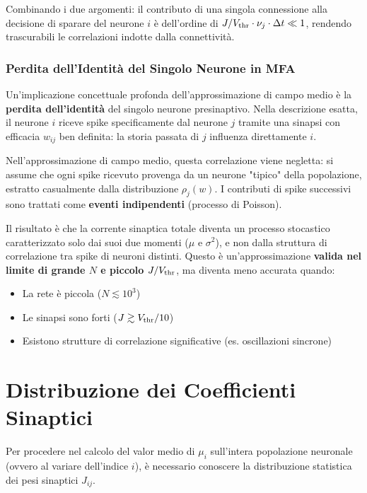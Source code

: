 Combinando i due argomenti: il contributo di una singola connessione alla decisione di sparare del neurone $i$ è dell'ordine di $J/V_{\rm thr} \cdot \nu_j \cdot \Delta t \ll 1$, rendendo trascurabili le correlazioni indotte dalla connettività.


\subsubsection{Perdita dell'Identità del Singolo Neurone in MFA}

Un'implicazione concettuale profonda dell'approssimazione di campo medio è la \textbf{perdita dell'identità} del singolo neurone presinaptivo. Nella descrizione esatta, il neurone $i$ riceve spike specificamente dal neurone $j$ tramite una sinapsi con efficacia $w_{ij}$ ben definita: la storia passata di $j$ influenza direttamente $i$.

Nell'approssimazione di campo medio, questa correlazione viene negletta: si assume che ogni spike ricevuto provenga da un neurone "tipico" della popolazione, estratto casualmente dalla distribuzione $\rho_j(w)$. I contributi di spike successivi sono trattati come \textbf{eventi indipendenti} (processo di Poisson).

Il risultato è che la corrente sinaptica totale diventa un processo stocastico caratterizzato solo dai suoi due momenti ($\mu$ e $\sigma^2$), e non dalla struttura di correlazione tra spike di neuroni distinti. Questo è un'approssimazione \textbf{valida nel limite di grande $N$ e piccolo $J/V_{\rm thr}$}, ma diventa meno accurata quando:
\begin{itemize}
    \item La rete è piccola ($N \lesssim 10^3$)
    \item Le sinapsi sono forti ($J \gtrsim V_{\rm thr}/10$)
    \item Esistono strutture di correlazione significative (es. oscillazioni sincrone)
\end{itemize}



\section{Distribuzione dei Coefficienti Sinaptici }

Per procedere nel calcolo del valor medio di $\mu_i$ sull'intera popolazione neuronale (ovvero al variare dell'indice $i$), è necessario conoscere la distribuzione statistica dei pesi sinaptici $J_{ij}$. 

